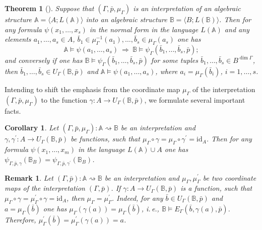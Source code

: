 \documentclass[12pt]{article}
\newtheorem{theorem}{Theorem}
\newtheorem{corollary}{Corollary}
\newtheorem{remark}{Remark}
\theoremstyle{definition}
\def\MA{{\mathbb{A}}}
\def\MB{{\mathbb{B}}}
\def\id{{\mathrm{id}}}
\begin{document}
\begin{theorem}[{\cite[The Reduction Theorem]{Th_int1}}]\label{RT} 
Suppose that $(\Gamma,\bar p, \mu_\Gamma)$ is an interpretation of an algebraic structure $\MA=\langle A; L(\MA)\rangle$ into an algebraic structure $\MB=\langle B; L(\MB)\rangle$. 
Then for any formula $\psi(x_1,\ldots,x_s)$ in the normal form in the language $L(\MA)$ and any elements $a_1,\ldots,a_s\in A$, $\bar b_1\in \mu_\Gamma^{-1}(a_1),\ldots,\bar b_s\in \mu_\Gamma(a_s)$ one has
\begin{equation*}
 \MA\models \psi(a_1,\ldots,a_s) \ \Longrightarrow \ \MB\models \psi_\Gamma(\bar b_1,\ldots,\bar b_s,\bar p);
\end{equation*}
and conversely if one has $\MB\models \psi_\Gamma(\bar b_1,\ldots,\bar b_s,\bar p)$ for some tuples $\bar b_1,\ldots,\bar b_s\in B^{\dim\Gamma}$, then $\bar b_1,\ldots,\bar b_s\in U_\Gamma(\MB,\bar p)$ and $\MA\models \psi(a_1,\ldots,a_s)$, where $a_i=\mu_\Gamma(\bar b_i)$, $i=1,\ldots,s$.
\end{theorem}

Intending to shift the emphasis from the coordinate map $\mu_\Gamma$ of the interpretation $(\Gamma,\bar p,\mu_\Gamma)$ to the function $\gamma\colon A\to U_\Gamma(\MB,\bar p)$, we formulate several important facts.

\begin{corollary}\label{cor:gamma}
Let $(\Gamma,\bar p,\mu_\Gamma)\colon \MA\rightsquigarrow\MB$ be an interpretation and $\gamma,\gamma^\prime\colon A\to U_\Gamma(\MB,\bar p)$ be functions, such that $\mu_\Gamma\circ\gamma=\mu_\Gamma\circ\gamma^\prime=\id_A$. Then for any formula $\psi(x_1,\ldots,x_m)$ in the language $L(\MA)\cup A$ one has $\psi_{\Gamma,\bar p,\gamma}(\MB_B)=\psi_{\Gamma,\bar p,\gamma^\prime}(\MB_B)$.
\end{corollary}

\begin{remark}\label{lemma:gamma}
Let $(\Gamma,\bar p)\colon \MA\rightsquigarrow\MB$ be an interpretation and $\mu_\Gamma,\mu_\Gamma^\prime$ be two coordinate maps of the interpretation $(\Gamma,\bar p)$. If $\gamma\colon A\to U_\Gamma(\MB,\bar p)$ is a function, such that $\mu_\Gamma\circ\gamma=\mu^\prime_\Gamma\circ\gamma=\id_A$, then $\mu_\Gamma=\mu_\Gamma^\prime$. Indeed, for any $\bar b\in U_\Gamma(\MB,\bar p)$ and $a=\mu_\Gamma(\bar b)$ one has $\mu_\Gamma(\gamma(a))=\mu_\Gamma(\bar b)$, i.\,e., $\MB\models E_\Gamma(\bar b,\gamma(a),\bar p)$. Therefore, $\mu^\prime_\Gamma(\bar b)=\mu^\prime_\Gamma(\gamma(a))=a$. 
\end{remark}
\end{document}

